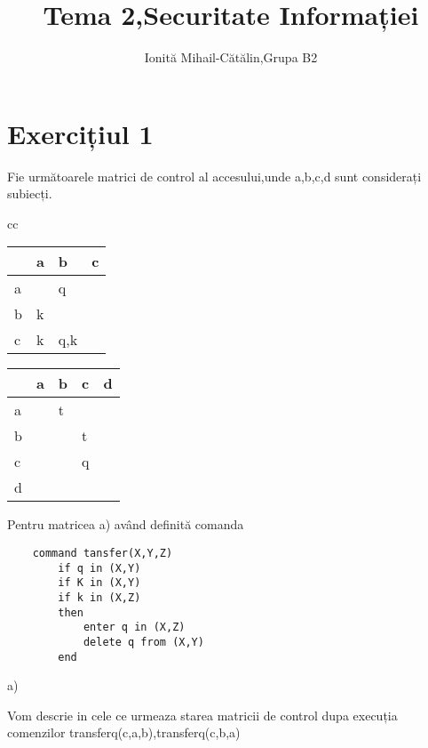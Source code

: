 \documentclass{article}
\title{Tema 2,Securitate Informației}
\author{Ionită Mihail-Cătălin,Grupa B2}
\begin{document}
\maketitle

\section{Exercițiul 1}

Fie următoarele matrici de control al accesului,unde a,b,c,d sunt considerați subiecți.

\begin{center}
\setlength{\tabcolsep}{12pt}
\begin{tabular}{cc}
        \begin{tabular}{|l|l|l|l|} 
        \hline
          & a & b   & c  \\ 
        \hline
        a &   & q   &    \\ 
        \hline
        b & k &     &    \\ 
        \hline
        c & k & q,k &    \\
        \hline
        \end{tabular}
        
        \begin{tabular}{|l|l|l|l|l|} 
        \hline
          & a & b & c & d  \\ 
        \hline
        a &   & t &   &    \\ 
        \hline
        b &   &   & t &    \\ 
        \hline
        c &   &   & q &    \\ 
        \hline
        d &   &   &   &    \\
        \hline
        \end{tabular}
    \end{tabular}
\end{center}

Pentru matricea a) având definită comanda
\begin{center}
    \begin{lstlisting}
    command tansfer(X,Y,Z)
        if q in (X,Y)
        if K in (X,Y)
        if k in (X,Z)
        then
            enter q in (X,Z)
            delete q from (X,Y)
        end
    \end{lstlisting}
\end{center}
a)

Vom descrie in cele ce urmeaza starea matricii de control dupa execuția comenzilor transferq(c,a,b),transferq(c,b,a) 
\end{document}
